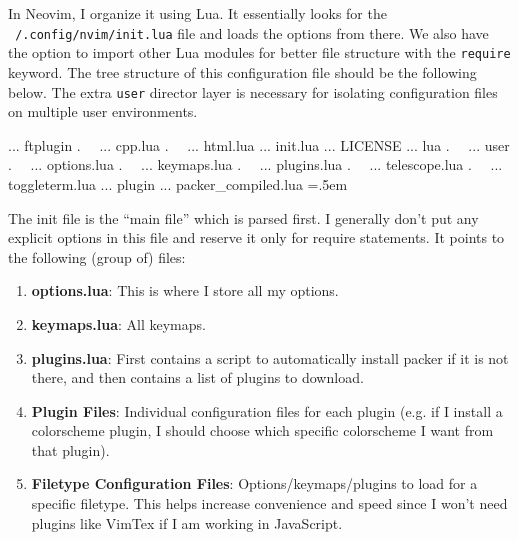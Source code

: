 \documentclass{article}
\newenvironment{cverbatim}
    {\SaveVerbatim{cverb}}
    {\endSaveVerbatim
    \flushleft\fboxrule=0pt\fboxsep=.5em
    \colorbox{cverbbg}{%
      \makebox[\dimexpr\linewidth-2\fboxsep][l]{\BUseVerbatim{cverb}}%
    }
    \endflushleft
  }
\begin{document}
    In Neovim, I organize it using Lua. It essentially looks for the \texttt{~/.config/nvim/init.lua} file and loads the options from there. We also have the option to import other Lua modules for better file structure with the \texttt{require} keyword. The tree structure of this configuration file should be the following below. The extra \texttt{user} director layer is necessary for isolating configuration files on multiple user environments.  
    
    \begin{cverbatim}
      ... ftplugin
      .   ... cpp.lua
      .   ... html.lua
      ... init.lua
      ... LICENSE
      ... lua
      .   ... user
      .       ... options.lua
      .       ... keymaps.lua
      .       ... plugins.lua
      .       ... telescope.lua
      .       ... toggleterm.lua
      ... plugin
          ... packer_compiled.lua
    \end{cverbatim}

    The init file is the ``main file'' which is parsed first. I generally don't put any explicit options in this file and reserve it only for require statements. It points to the following (group of) files: 
    \begin{enumerate}
      \item \textbf{options.lua}: This is where I store all my options. 
      \item \textbf{keymaps.lua}: All keymaps. 
      \item \textbf{plugins.lua}: First contains a script to automatically install packer if it is not there, and then contains a list of plugins to download. 
      \item \textbf{Plugin Files}: Individual configuration files for each plugin (e.g. if I install a colorscheme plugin, I should choose which specific colorscheme I want from that plugin). 
      \item \textbf{Filetype Configuration Files}: Options/keymaps/plugins to load for a specific filetype. This helps increase convenience and speed since I won't need plugins like VimTex if I am working in JavaScript. 
    \end{enumerate}
\end{document}
